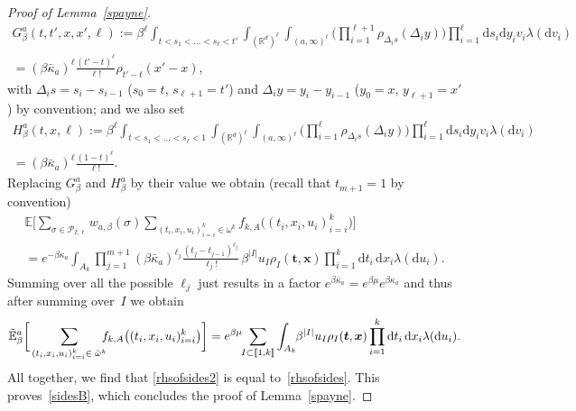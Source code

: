 \documentclass[10pt]{amsart}
\let\mathcal\mathscr
\newcommand{\lint}{\mathopen{[\![}}
\newcommand{\rint}{\mathclose{]\!]}}
\theoremstyle{definition}
\newcommand{\bt}{\boldsymbol{t}}
\newcommand{\bx}{\boldsymbol{x}}
\newcommand{\dd}{\mathrm{d}}
\newcommand{\cP}{{\ensuremath{\mathcal P}} }
\newcommand{\bbE}{{\ensuremath{\mathbb E}} }
\newcommand{\bbR}{{\ensuremath{\mathbb R}} }
\let\gb\beta
\let\go\omega
\begin{document}
\begin{proof}[Proof of Lemma~\ref{spayne}]
\begin{multline*}
G^{a}_{\beta}(t,t',x,x',\ell):=
\beta^{\ell} \int_{ t< s_1<\dots<s_{\ell}<t' } \int_{(\bbR^d)^{\ell}} \int_{(a,\infty)^\ell}
\biggl(\prod_{i=1}^{\ell+1}
\rho_{\Delta_i s}(\Delta_i y) \biggr)
\prod_{i=1}^{\ell} \dd s_i \dd y_i v_i \lambda(\dd v_i)
\\
=\left(\gb \bar \kappa_a\right)^{\ell}\frac{(t'-t)^{\ell}}{\ell!} \rho_{t'-t}(x'-x),
\end{multline*}
with $\Delta_i s = s_{i}-s_{i-1}$ ($s_0=t$, $s_{\ell+1}=t'$) and $\Delta_i y = y_{i}-y_{i-1}$ ($y_0=x$, $y_{\ell+1}=x'$) by convention;
and we also set\vspace*{-5pt}
\begin{multline*}
H^{a}_{\beta}(t,x, \ell):=
\beta^{\ell} \int_{ t< s_1<\dots<s_{\ell}<1} \int_{(\bbR^d)^{\ell}} \int_{(a,\infty)^\ell} \biggl(\prod_{i=1}^{\ell}
\rho_{\Delta_i s}(\Delta_i y) \biggr)
\prod_{i=1}^{\ell} \dd s_i \dd y_i v_i \lambda(\dd v_i)
\\[-8pt]
=\left(\gb \bar \kappa_a \right)^{\ell}\frac{(1-t)^\ell}{\ell!}.
\end{multline*}
Replacing $G_\gb^a$ and $H_{\gb}^a$ by their value we obtain (recall that $t_{m+1}=1$ by convention)\vspace*{-5pt}
\begin{multline*}
\bbE \bigg[ \sum_{\sigma\in \cP_{I,\ell} } w_{a,\beta}(\sigma)\sum_{(t_i,x_i,u_i)_{i=i}^k\in \go^k} f_{k,A}\bigl((t_i,x_i,u_i)_{i=i}^k \bigr) \bigg] \\[-3pt]
= e^{- \gb \kappa_a } \int_{A_k} \prod_{j=1}^{m+1}\left(\gb \bar \kappa_a \right)^{\ell_j}\frac{(t_{j}-t_{j-1})^{\ell_j}}{\ell_j! }\, \beta^{|I|} u_I \rho_I(\bt,\bx) \prod_{i=1}^k \dd t_i\,\dd x_i \lambda(\dd u_i).
\end{multline*}
Summing over all the possible $\ell_j$ just results in a factor $e^{\beta \bar \kappa_a} =e^{\gb \mu} e^{\gb \kappa_a}$ and thus after summing over~$I$
we obtain
\[
\tilde \bbE_{\gb}^{a} \bigg[ \sum_{(t_i,x_i,u_i)_{i=i}^k\in \; \hat \go^k}\hspace*{-2mm} f_{k,A} \bigl((t_i,x_i,u_i)_{i=i}^k \bigr) \bigg]
= e^{\beta \mu}\hspace*{-1mm} \sum_{I\subset \lint 1,k\rint}
\int_{A_k}\hspace*{-1mm} \beta^{|I|} u_I \rho_I(\bt,\bx) \prod_{i=1}^k \dd t_i\,\dd x_i \lambda(\dd u_i).
\]
All together, we find that \eqref{rhsofsides2} is equal to~\eqref{rhsofsides}. This proves~\eqref{sidesB},
which concludes the proof of Lemma~\ref{spayne}.
\end{proof}
\end{document}
